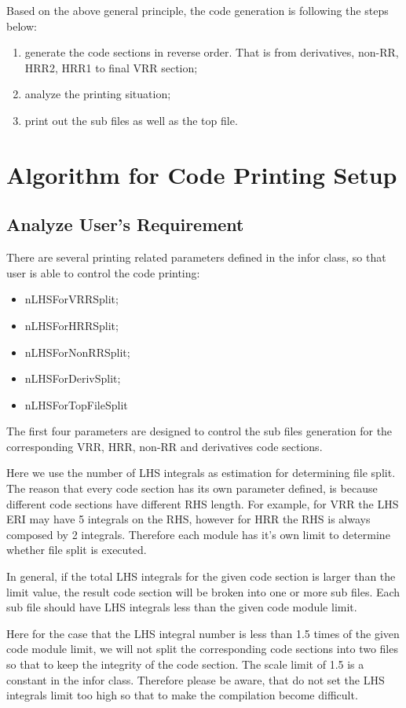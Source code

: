 Based on the above general principle, the code generation is following the 
steps below:
\begin{enumerate}
 \item generate the code sections in reverse order. That is from derivatives,
 non-RR, HRR2, HRR1 to final VRR section;
 \item analyze the printing situation;
 \item print out the sub files as well as the top file.
\end{enumerate}

\section{Algorithm for Code Printing Setup}

\subsection{Analyze User's Requirement}
\label{code_generation_user}

There are several printing related parameters defined in the infor class, so that
user is able to control the code printing:
\begin{itemize}
 \item nLHSForVRRSplit;
 \item nLHSForHRRSplit;
 \item nLHSForNonRRSplit;
 \item nLHSForDerivSplit;
 \item nLHSForTopFileSplit
\end{itemize}
The first four parameters are designed to control the sub files generation 
for the corresponding VRR, HRR, non-RR and derivatives code sections. 

Here we use the number of LHS integrals as estimation for determining file split.
The reason that every code section has its own parameter defined, is because
different code sections have different RHS length. For example, for VRR the 
LHS ERI may have 5 integrals on the RHS, however for HRR the RHS is always
composed by 2 integrals. Therefore each module has it's own limit to determine
whether file split is executed.

In general, if the total LHS integrals for the given code section is larger 
than the limit value, the result code section will be broken into one or more sub files.
Each sub file should have LHS integrals less than the given code module limit.

Here for the case that the LHS integral number is less than 1.5 times of the given
code module limit, we will not split the corresponding code sections into two files
so that to keep the integrity of the code section. The scale limit of 1.5 is a 
constant in the infor class. Therefore please be aware, that do not set the 
LHS integrals limit too high so that to make the compilation become difficult.


